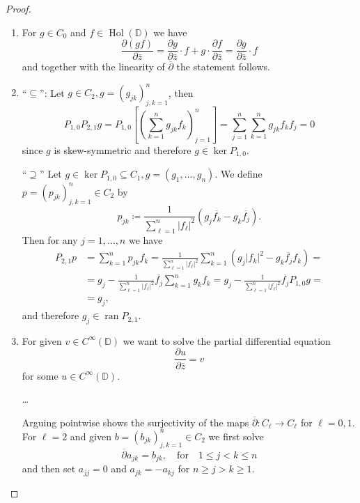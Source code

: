 \documentclass[letterpaper, 11pt]{article}
\newcommand{\D}{\mathbb{D}}
\newcommand{\1}{\mathds{1}}
\DeclareMathOperator*{\ran}{ran}
\DeclareMathOperator*{\Hol}{Hol}
\theoremstyle{definition}
\begin{document}
\begin{proof}{\ }
  \begin{enumerate}
    \item For $g \in C_0$ and $f \in \Hol(\D)$ we have
    $$ \frac{\partial (gf)}{\partial \bar{z}} = \frac{\partial g}{\partial \bar{z}} \cdot f + g \cdot \frac{\partial f}{\partial \bar{z}} = \frac{\partial g}{\partial \bar{z}} \cdot f $$
    and together with the linearity of $\overline{\partial}$ the statement follows.
    \item ``$\subseteq$'': Let $g \in C_2, g = (g_{jk})_{j,k=1}^n$, then
    $$ P_{1,0} P_{2,1} g = P_{1,0} \left[ \left( \sum_{k=1}^n g_{jk} f_k \right)_{j=1}^n \right] = \sum_{j=1}^n \sum_{k=1}^n g_{jk} f_k f_j = 0 $$
    since $g$ is skew-symmetric and therefore $g \in \ker P_{1,0}$.

    ``$\supseteq$'' Let $g \in \ker P_{1,0} \subseteq C_1, g = (g_1, \dots, g_n)$. We define $p = (p_{jk})_{j,k=1}^n \in C_2$ by
    $$ p_{jk} \coloneqq \frac{1}{\displaystyle\sum_{\ell=1}^n \vert f_\ell \vert^2} (g_j \overline{f_k} - g_k \overline{f_j}). $$
    Then for any $j=1,\dots,n$ we have
    \begin{align*}
      P_{2,1} p &= \sum_{k=1}^n p_{jk} f_k = \frac{1}{\displaystyle\sum_{\ell=1}^n \vert f_\ell \vert^2} \sum_{k=1}^n (g_j \vert f_k \vert^2 - g_k \overline{f_j} f_k) = \\
      &= g_j - \frac{1}{\displaystyle\sum_{\ell=1}^n \vert f_\ell \vert^2} \overline{f_j} \sum_{k=1}^n g_k f_k = g_j - \frac{1}{\displaystyle\sum_{\ell=1}^n \vert f_\ell \vert^2} \overline{f_j} P_{1,0} g = \\
      &= g_j,
    \end{align*}
    and therefore $g_j \in \ran P_{2,1}$.
    \item For given $v \in C^\infty(\D)$ we want to solve the partial differential equation
    $$ \frac{\partial u}{\partial \bar{z}} = v $$
    for some $u \in C^\infty(\D)$.

    \dots

    Arguing pointwise shows the surjectivity of the maps $\overline{\partial} : C_\ell \to C_\ell$ for $\ell = 0, 1$. For $\ell = 2$ and given $b = (b_{jk})_{j,k=1}^n \in C_2$ we first solve
    $$ \overline{\partial} a_{jk} = b_{jk}, \quad \textrm{for} \quad 1 \leq j < k \leq n $$
    and then set $a_{jj} = 0$ and $a_{jk} = -a_{kj}$ for $n \geq j > k \geq 1$.
  \end{enumerate}
\end{proof}
\end{document}
